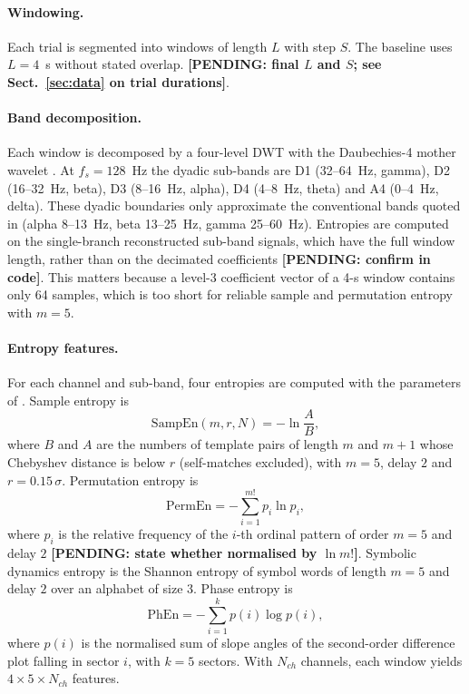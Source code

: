 \documentclass[11pt,a4paper]{article}
\newcommand{\pending}[1]{\textcolor{red!75!black}{\textbf{[PENDING: #1]}}}
\begin{document}
\paragraph{Windowing.}
Each trial is segmented into windows of length $L$ with step $S$. The baseline uses $L=4$~s without stated overlap. \pending{final $L$ and $S$; see Sect.~\ref{sec:data} on trial durations}.

\paragraph{Band decomposition.}
Each window is decomposed by a four-level DWT with the Daubechies-4 mother wavelet \cite{Mallat1989}. At $f_s=128$~Hz the dyadic sub-bands are D1 (32--64~Hz, gamma), D2 (16--32~Hz, beta), D3 (8--16~Hz, alpha), D4 (4--8~Hz, theta) and A4 (0--4~Hz, delta). These dyadic boundaries only approximate the conventional bands quoted in \cite{FarhadiSedehi2024a} (alpha 8--13~Hz, beta 13--25~Hz, gamma 25--60~Hz). Entropies are computed on the single-branch reconstructed sub-band signals, which have the full window length, rather than on the decimated coefficients \pending{confirm in code}. This matters because a level-3 coefficient vector of a 4-s window contains only 64 samples, which is too short for reliable sample and permutation entropy with $m=5$.

\paragraph{Entropy features.}
For each channel and sub-band, four entropies are computed with the parameters of \cite{FarhadiSedehi2024a}. Sample entropy \cite{Richman2000} is
\begin{equation}
\mathrm{SampEn}(m,r,N) = -\ln\frac{A}{B},
\end{equation}
where $B$ and $A$ are the numbers of template pairs of length $m$ and $m+1$ whose Chebyshev distance is below $r$ (self-matches excluded), with $m=5$, delay $2$ and $r=0.15\,\sigma$. Permutation entropy \cite{Bandt2002} is
\begin{equation}
\mathrm{PermEn} = -\sum_{i=1}^{m!} p_i \ln p_i,
\end{equation}
where $p_i$ is the relative frequency of the $i$-th ordinal pattern of order $m=5$ and delay $2$ \pending{state whether normalised by $\ln m!$}. Symbolic dynamics entropy \cite{Zebrowski2000} is the Shannon entropy of symbol words of length $m=5$ and delay $2$ over an alphabet of size $3$. Phase entropy \cite{Rohila2019} is
\begin{equation}
\mathrm{PhEn} = -\sum_{i=1}^{k} p(i)\log p(i),
\end{equation}
where $p(i)$ is the normalised sum of slope angles of the second-order difference plot falling in sector $i$, with $k=5$ sectors. With $N_{ch}$ channels, each window yields $4\times5\times N_{ch}$ features.
\end{document}

